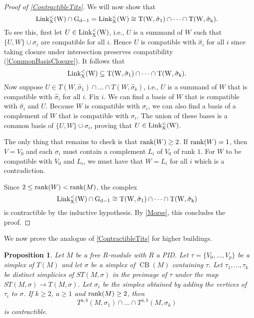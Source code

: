 \documentclass[a4paper]{amsart}
\DeclareMathOperator{\CB}{CB}
\newcommand{\m}{\to}
\providecommand{\Link}{\ensuremath\mr{Link}}
\numberwithin{theoremcounter}{section}
\newtheorem{proposition}[propositionauto]{Proposition}
\theoremstyle{definition}
\theoremstyle{remark}
\newcommand{\mr}[1]{{\rm #1}}
\newcommand{\rank}{\mr{rank}}
\begin{document}
\begin{proof}[Proof of \autoref{ContractibleTits}]
We  will now show that 
$$\Link^{<}_X(W) \cap G_{d-1} = \Link^{<}_X(W) \cong  T(W,\hat \sigma_1) \cap \dots \cap T(W,\hat \sigma_k).$$ 
To see this, first let $U \in \Link^{<}_X(W)$, i.e., $U$ is a summand of $W$ such that $\{U,W\}\cup \sigma_i$ are compatible for all $i$. Hence $U$ is compatible with $\hat \sigma_i$ for all $i$ since taking closure under intersection preserves compatibility (\autoref{CommonBasisClosure}). It follows that $$\Link^{<}_X(W) \subseteq  T(W,\hat \sigma_1) \cap \dots \cap T(W,\hat \sigma_k).$$
%
Now suppose $U \in T(W,\hat \sigma_1) \cap \dots \cap T(W,\hat \sigma_k)$, i.e., $U$ is a summand of $W$ that is compatible with $\hat \sigma_i$ for all $i$. Fix $i$. We can find a basis of $W$ that is compatible with $\hat \sigma_i$ and $U$. Because $W$ is compatible with $\sigma_i$, we can also find a basis of a complement of $W$ that is compatible with $\sigma_i$. The union of these bases is a common basis of $\{U,W\} \cup \sigma_i$, proving that $U \in \Link^{<}_X(W)$. 

The only thing that remains to check is that $\rank(W) \geq 2$. If $\rank(W)=1$, then $V=V_0$ and each $\sigma_i$ must contain a complement $L_i$ of $V_0$ of rank $1$. For $W$ to be compatible with $V_0$ and $L_i$, we must have that $W=L_i$ for all $i$ which is a contradiction. 

Since $ 2 \leq \rank(W) < \rank(M)$, the complex $$ \Link^{<}_X(W) \cap G_{d-1} \cong  T(W,\hat \sigma_1) \cap \dots \cap T(W,\hat \sigma_k)$$ is contractible by the inductive hypothesis. By \autoref{Morse}, this concludes the proof. 
\end{proof}

We now prove the analogue of \autoref{ContractibleTits} for higher buildings. 

\begin{proposition} \label{higherContractible}
Let $M$ be a free $R$-module with $R$ a PID.  Let $\tau=\{V_0,\dots,V_p\}$ be a simplex of $T(M)$ and let $\sigma$ be a simplex of ${\CB}(M)$ containing $\tau$. Let $\tau_1,\dots,\tau_k$ be distinct simplicies of $ST(M,\sigma)$ in the preimage of $\tau$ under the map $ST(M,\sigma) \m T(M,\sigma)$.  Let $\sigma_i$ be the simplex obtained by adding the vertices of $\tau_i$ to $\sigma$. If $k \geq 2$, $a \geq 1$ and $\rank (M) \geq 2$, then $$T^{a,b}(M,\sigma_1) \cap \dots \cap T^{a,b}(M,\sigma_k) $$ is contractible.



\end{proposition}
\end{document}
